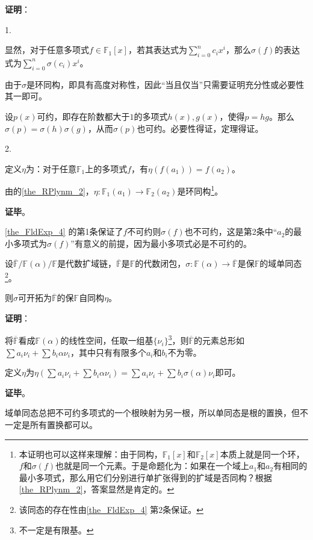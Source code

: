 \textbf{证明}：

1. 

显然，对于任意多项式$f\in\mathbb{F}_1[x]$，若其表达式为$\sum_{i=0}^n c_ix^i$，那么$\sigma(f)$的表达式为$\sum_{i=0}^n \sigma(c_i)x^i$。

由于$\sigma$是环同构，即具有高度对称性，因此“当且仅当”只需要证明充分性或必要性其一即可。

设$p(x)$可约，即存在阶数都大于$1$的多项式$h(x),g(x)$，使得$p=hg$。那么$\sigma(p)=\sigma(h)\sigma(g)$，从而$\sigma(p)$也可约。必要性得证，定理得证。

2. 

定义$\eta$为：对于任意$\mathbb{F}_1$上的多项式$f$，有$\eta(f(a_1))=f(a_2)$。

由的\autoref{the_RPlynm_2}，$\eta:\mathbb{F}_1(a_1)\to \mathbb{F}_2(a_2)$是环同构\footnote{本证明也可以这样来理解：由于同构，$\mathbb{F}_1[x]$和$\mathbb{F}_2[x]$本质上就是同一个环，$f$和$\sigma(f)$也就是同一个元素。于是命题化为：如果在一个域上$a_1$和$a_2$有相同的最小多项式，那么用它们分别进行单扩张得到的扩域是否同构？根据\autoref{the_RPlynm_2}，答案显然是肯定的。}。



\textbf{证毕}。

\autoref{the_FldExp_4} 的第1条保证了$f$不可约则$\sigma(f)$也不可约，这是第2条中“$a_2$的最小多项式为$\sigma(f)$”有意义的前提，因为最小多项式必是不可约的。

\begin{theorem}{}\label{the_FldExp_5}
设$\overline{\mathbb{F}}/\mathbb{F}(\alpha)/\mathbb{F}$是代数扩域链，$\overline{\mathbb{F}}$是$\mathbb{F}$的代数闭包，$\sigma:\mathbb{F}(\alpha)\to\overline{\mathbb{F}}$是保$\mathbb{F}$的域单同态\footnote{该同态的存在性由\autoref{the_FldExp_4} 第2条保证。}。

则$\sigma$可开拓为$\overline{\mathbb{F}}$的保$\mathbb{F}$自同构$\eta$。
\end{theorem}

\textbf{证明}：


将$\overline{\mathbb{F}}$看成$\mathbb{F}(\alpha)$的线性空间，任取一组基$\{\nu_i\}$\footnote{不一定是有限基。}，则$\overline{\mathbb{F}}$的元素总形如$\sum a_i\nu_i+\sum b_i\alpha\nu_i$，其中只有有限多个$a_i$和$b_i$不为零。

定义$\eta$为$\eta(\sum a_i\nu_i+\sum b_i\alpha\nu_i) = \sum a_i\nu_i+\sum b_i\sigma(\alpha)\nu_i$即可。

\textbf{证毕}。

域单同态总把不可约多项式的一个根映射为另一根，所以单同态是根的置换，但不一定是所有置换都可以。

